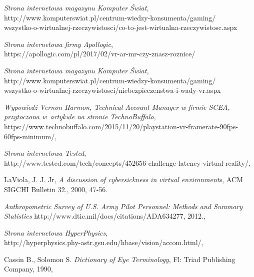 \documentclass[a4paper,11pt,twoside]{report}
\theoremstyle{definition}
\begin{document}
\begin{thebibliography}{20}%

 \emph{Strona internetowa magazynu Komputer Świat},\\http://www.komputerswiat.pl/centrum-wiedzy-konsumenta/gaming/\\wszystko-o-wirtualnej-rzeczywistosci/co-to-jest-wirtualna-rzeczywistosc.aspx

 \emph{Strona internetowa firmy Apollogic},\\https://apollogic.com/pl/2017/02/vr-ar-mr-czy-znasz-roznice/

 \emph{Strona internetowa magazynu Komputer Świat},\\http://www.komputerswiat.pl/centrum-wiedzy-konsumenta/gaming/\\wszystko-o-wirtualnej-rzeczywistosci/niebezpieczenstwa-i-wady-vr.aspx

 \emph{Wypowiedź Vernon Harmon, Technical Account Manager w firmie SCEA, przytoczona w~artykule na stronie TechnoBuffalo},\\https://www.technobuffalo.com/2015/11/20/playstation-vr-framerate-90fps-60fps-minimum/,

 \emph{Strona internetowa Tested},\\http://www.tested.com/tech/concepts/452656-challenge-latency-virtual-reality/,

 LaViola, J. J. Jr, \emph{A discussion of cybersickness in virtual environments}, ACM SIGCHI Bulletin 32., 2000, 47-56.

 \emph{Anthropometric Survey of U.S. Army Pilot Personnel: Methods and Summary Statistics} http://www.dtic.mil/docs/citations/ADA634277, 2012.,

 \emph{Strona internetowa HyperPhysics},\\http://hyperphysics.phy-astr.gsu.edu/hbase/vision/accom.html/,

 Cassin B., Solomon S. \emph{Dictionary of Eye Terminology}, Fl: Triad Publishing Company, 1990,

\end{thebibliography}
\thispagestyle{empty}
\end{document}
